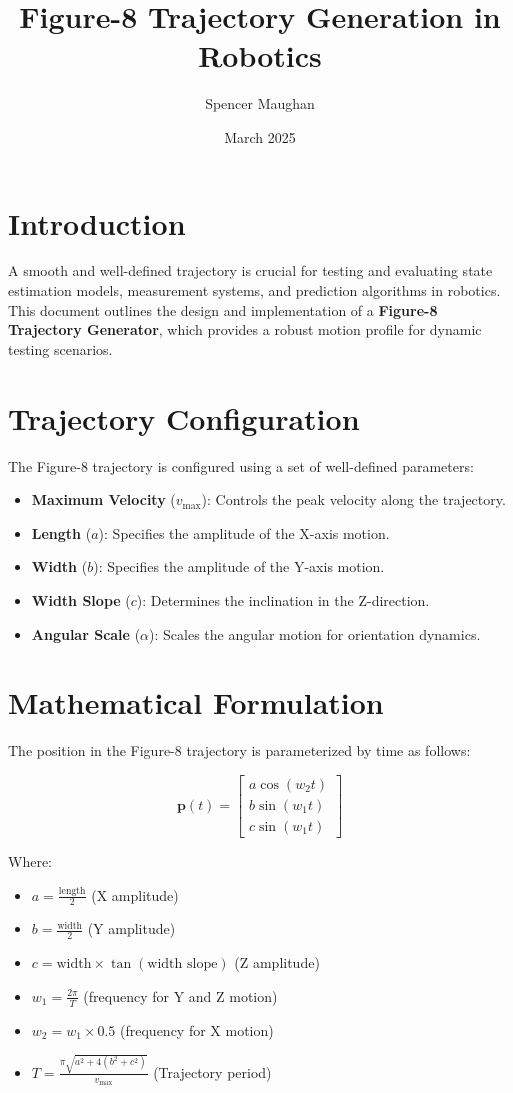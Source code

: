 \documentclass{article}
\title{Figure-8 Trajectory Generation in Robotics}
\author{Spencer Maughan}
\date{March 2025}
\begin{document}
	\maketitle

	\section{Introduction}
	A smooth and well-defined trajectory is crucial for testing and evaluating state estimation models, measurement systems, and prediction algorithms in robotics. This document outlines the design and implementation of a \textbf{Figure-8 Trajectory Generator}, which provides a robust motion profile for dynamic testing scenarios.

	\section{Trajectory Configuration}
	The Figure-8 trajectory is configured using a set of well-defined parameters:

	\begin{itemize}
		\item \textbf{Maximum Velocity} ($v_{\text{max}}$): Controls the peak velocity along the trajectory.
		\item \textbf{Length} ($a$): Specifies the amplitude of the X-axis motion.
		\item \textbf{Width} ($b$): Specifies the amplitude of the Y-axis motion.
		\item \textbf{Width Slope} ($c$): Determines the inclination in the Z-direction.
		\item \textbf{Angular Scale} ($\alpha$): Scales the angular motion for orientation dynamics.
	\end{itemize}

	\section{Mathematical Formulation}
	The position in the Figure-8 trajectory is parameterized by time as follows:

	\[
	\mathbf{p}(t) =
	\begin{bmatrix}
		a \cos(w_2 t) \\
		b \sin(w_1 t) \\
		c \sin(w_1 t)
	\end{bmatrix}
	\]

	Where:
	\begin{itemize}
		\item $a = \frac{\text{length}}{2}$ (X amplitude)
		\item $b = \frac{\text{width}}{2}$ (Y amplitude)
		\item $c = \text{width} \times \tan(\text{width slope})$ (Z amplitude)
		\item $w_1 = \frac{2\pi}{T}$ (frequency for Y and Z motion)
		\item $w_2 = w_1 \times 0.5$ (frequency for X motion)
		\item $T = \frac{\pi \sqrt{a^2 + 4(b^2 + c^2)}}{v_{\text{max}}}$ (Trajectory period)
	\end{itemize}
\end{document}
